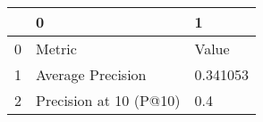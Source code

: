 \begin{tabular}{lll}
\toprule
{} &                       0 &         1 \\
\midrule
0 &                  Metric &     Value \\
1 &       Average Precision &  0.341053 \\
2 &  Precision at 10 (P@10) &       0.4 \\
\bottomrule
\end{tabular}
